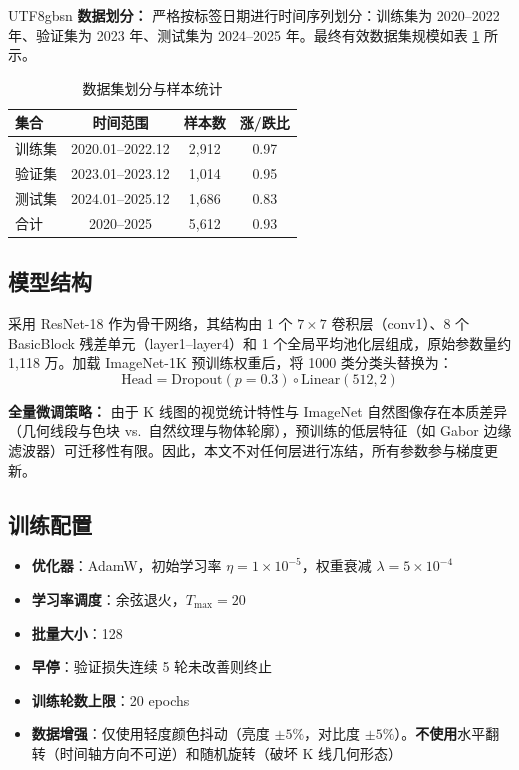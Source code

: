 \documentclass[12pt,a4paper]{article}
\begin{document}
\begin{CJK}{UTF8}{gbsn}
\textbf{数据划分：} 严格按标签日期进行时间序列划分：训练集为 2020--2022 年、验证集为 2023 年、测试集为 2024--2025 年。最终有效数据集规模如表 \ref{tab:dataset} 所示。

\begin{table}[H]
\centering
\caption{数据集划分与样本统计}
\label{tab:dataset}
\begin{tabular}{lccc}
\toprule
\textbf{集合} & \textbf{时间范围} & \textbf{样本数} & \textbf{涨/跌比} \\
\midrule
训练集 & 2020.01--2022.12 & 2,912 & 0.97 \\
验证集 & 2023.01--2023.12 & 1,014 & 0.95 \\
测试集 & 2024.01--2025.12 & 1,686 & 0.83 \\
\midrule
合计   & 2020--2025        & 5,612 & 0.93 \\
\bottomrule
\end{tabular}
\end{table}

\subsection{模型结构}

采用 ResNet-18 作为骨干网络，其结构由 1 个 $7\times7$ 卷积层（conv1）、8 个 BasicBlock 残差单元（layer1--layer4）和 1 个全局平均池化层组成，原始参数量约 1,118 万。加载 ImageNet-1K 预训练权重后，将 1000 类分类头替换为：
\begin{equation}
\text{Head} = \text{Dropout}(p=0.3) \circ \text{Linear}(512, 2)
\end{equation}

\textbf{全量微调策略：} 由于 K 线图的视觉统计特性与 ImageNet 自然图像存在本质差异（几何线段与色块 vs.\ 自然纹理与物体轮廓），预训练的低层特征（如 Gabor 边缘滤波器）可迁移性有限。因此，本文不对任何层进行冻结，所有参数参与梯度更新。

\subsection{训练配置}

\begin{itemize}[noitemsep]
    \item \textbf{优化器}：AdamW，初始学习率 $\eta = 1 \times 10^{-5}$，权重衰减 $\lambda = 5 \times 10^{-4}$
    \item \textbf{学习率调度}：余弦退火，$T_{\max}=20$
    \item \textbf{批量大小}：128
    \item \textbf{早停}：验证损失连续 5 轮未改善则终止
    \item \textbf{训练轮数上限}：20 epochs
    \item \textbf{数据增强}：仅使用轻度颜色抖动（亮度 $\pm 5\%$，对比度 $\pm 5\%$）。\textbf{不使用}水平翻转（时间轴方向不可逆）和随机旋转（破坏 K 线几何形态）
\end{itemize}


\end{CJK}
\end{document}

